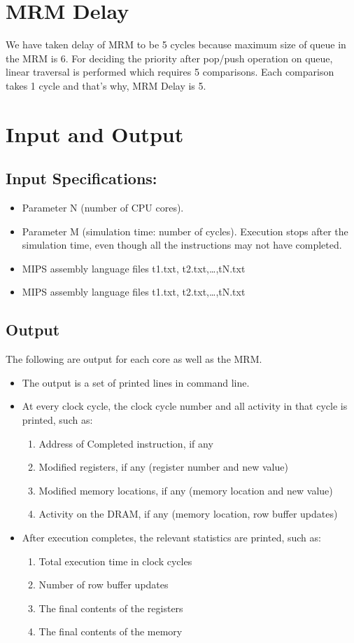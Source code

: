 \documentclass{article} %
\begin{document}
\section{MRM Delay}
We have taken delay of MRM to be 5 cycles because maximum size of queue in the MRM is 6. For deciding the priority after pop/push operation on queue, linear traversal is performed which requires 5 comparisons. Each comparison takes 1 cycle and that's why, MRM Delay is 5.

\section{Input and Output}
\subsection{Input Specifications:}
\begin{itemize}
    \item Parameter N (number of CPU cores).
    \item Parameter   M   (simulation   time:   number   of   cycles).   Execution   stops   after   the simulation time, even though all the instructions may not have completed.
    \item MIPS assembly language files t1.txt, t2.txt,…,tN.txt
    \item MIPS assembly language files t1.txt, t2.txt,…,tN.txt
\end{itemize}
\subsection{Output}
The following are output for each core as well as the MRM.
\begin{itemize}
    \item The output is a set of printed lines in command line.
    \item At every clock cycle, the clock cycle number and all activity in that cycle is printed, such as:
    \begin{enumerate}
        \item Address of Completed instruction, if any
        \item Modified registers, if any (register number and new value)
        \item Modified memory locations, if any (memory location and new value)
        \item Activity on the DRAM, if any (memory location, row buffer updates)
    \end{enumerate}
    \item After execution completes, the relevant statistics are printed, such as:
    \begin{enumerate}
        \item Total execution time in clock cycles
        \item Number of row buffer updates
        \item The final contents of the registers
        \item The final contents of the memory
    \end{enumerate}
\end{itemize}
\end{document}
